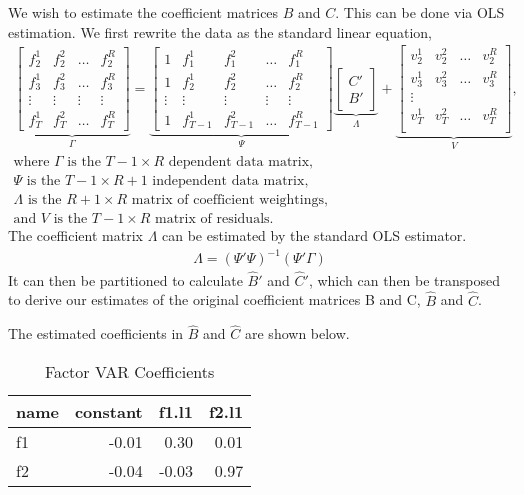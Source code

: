 \documentclass[11pt, letterpaper]{article}\usepackage[]{graphicx}\usepackage[]{color}
\begin{document}
We wish to estimate the coefficient matrices $B$ and $C$. This can be done via OLS estimation. We first rewrite the data as the standard linear equation,
\begin{align*}
\underbrace{\begin{bmatrix}
f^1_{2} & f^2_{2} & \dots & f^R_{2}\\
f^1_{3} & f^2_{3} & \dots & f^R_{3}\\
\vdots & \vdots & \vdots & \vdots \\
f^1_{T} & f^2_{T} & \dots & f^R_{T}
\end{bmatrix}}_{\Gamma}
=
\underbrace{\begin{bmatrix}
1 & f^1_{1} & f^2_{1} & \dots & f^R_{1}\\
1 & f^1_{2} & f^2_{2} & \dots & f^R_{2}\\
\vdots & \vdots & \vdots & \vdots & \vdots \\
1 & f^1_{T-1} & f^2_{T-1} & \dots & f^R_{T-1}
\end{bmatrix}}_{\Psi}
\underbrace{\begin{bmatrix}
C'\\
B'
\end{bmatrix}}_{\Lambda}
 +
\underbrace{\begin{bmatrix}
v^1_2 & v^2_2 & \dots & v^R_2\\
v^1_3 & v^2_3 & \dots & v^R_3\\
\vdots\\
v^1_T & v^2_T & \dots & v^R_T\\
\end{bmatrix}}_{V},\\
\text{where $\Gamma$ is the $T-1 \times R$ dependent data matrix,}\\
\text{$\Psi$ is the $T-1 \times R+1$ independent data matrix,}\\
\text{$\Lambda$ is the $R+1 \times R$ matrix of coefficient weightings,}\\
\text{and $V$ is the $T-1 \times R$ matrix of residuals.}
\end{align*}
The coefficient matrix $\Lambda$ can be estimated by the standard OLS estimator.
\begin{align*}
\widehat{\Lambda} = (\Psi' \Psi)^{-1} (\Psi'\Gamma)
\end{align*}
It can then be partitioned to calculate $\widehat{B}'$ and $\widehat{C}'$, which can then be transposed to derive our estimates of the original coefficient matrices B and C, $\widehat{B}$ and $\widehat{C}$.

The estimated coefficients in $\widehat{B}$ and $\widehat{C}$ are shown below.
\begin{table}[H]
\centering
\begingroup\footnotesize
\begin{tabular}{lrrr}
  \hline
name & constant & f1.l1 & f2.l1 \\ 
  \hline
f1 & -0.01 & 0.30 & 0.01 \\ 
  f2 & -0.04 & -0.03 & 0.97 \\ 
   \hline
\end{tabular}
\endgroup
\caption{Factor VAR Coefficients} 
\end{table}
\end{document}
